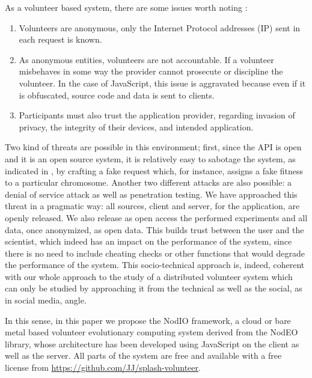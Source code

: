 \documentclass[journal,onecolumn]{IEEEtran}
\begin{document}
As a volunteer based system, there are some issues worth 
noting \cite{sarmenta2001volunteer,web:BOINC} :\begin{enumerate}
\item Volunteers are anonymous, only the Internet Protocol addresses (IP) sent in 
each request is known.
\item As anonymous entities, volunteers are not accountable. 
If a volunteer misbehaves in some way the provider cannot 
prosecute or discipline the volunteer. In the case of JavaScript,
this issue is aggravated because even if it is obfuscated, source code
and data is sent to clients. 
\item Participants must also trust the application provider, 
regarding invasion of privacy, the integrity of their devices, 
and intended application. 
\end{enumerate}

Two kind of threats are possible in this environment; first, since the
API is open and it is an open source system, it is relatively easy to
sabotage the system, as indicated in \cite{domingues2007sabotage}, by
crafting a fake request which, for instance, assigns a fake fitness to
a particular chromosome.
Another two different attacks are also
possible: a denial of service attack as well as penetration
testing. We have approached this threat in a pragmatic way: all
sources, client and server, for the application, are openly released. 
 We also release as open access the performed experiments \cite{DBLP:journals/corr/GuervosG15} and all data, once anonymized, as open data. This
builds trust between the user and the scientist, which indeed has an
impact on the performance of the system, since there is no need to
include cheating checks or other functions that would degrade the
performance of the system. This socio-technical approach is, indeed,
coherent with our whole approach to the study of a distributed volunteer
 system which can only be studied by approaching it from the
technical as well as the social, as in social media, angle. 

In this sense, in this paper we propose the {\sf NodIO} framework, a
cloud or bare metal based volunteer evolutionary computing system
derived from %
 the {\sf NodEO} library, whose architecture has been
developed using JavaScript on the client as well as the server.
All parts of the system are free and available with a free license
from \url{https://github.com/JJ/splash-volunteer}.
\end{document}

